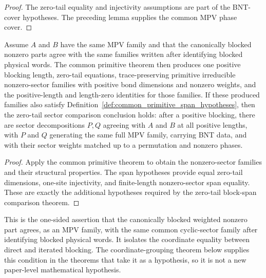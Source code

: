 \begin{proof}
	\leanok
	The zero-tail equality and injectivity assumptions are part of the BNT-cover
	hypotheses. The preceding lemma supplies the common MPV phase cover.
\end{proof}

\begin{lemma}%
\label{lem:afterBlocking_sectorComparison_zeroTail_of_reindexedNonzeroParts_spanHypotheses}
	\leanok
		Assume $A$ and $B$ have the same MPV family and that the canonically blocked
		nonzero parts agree with the same families written after identifying
		blocked physical words.  The common primitive theorem then produces one
	positive blocking length, zero-tail equations, trace-preserving primitive
	irreducible nonzero-sector families with positive bond dimensions and nonzero
	weights, and the positive-length and length-zero identities for those
	families.  If these produced families also satisfy
	Definition~\ref{def:common_primitive_span_hypotheses}, then the zero-tail
	sector comparison conclusion holds: after a positive blocking, there are
	sector decompositions $P,Q$ agreeing with $A$ and $B$ at all positive lengths,
	with $P$ and $Q$ generating the same full MPV family, carrying BNT data, and
	with their sector weights matched up to a permutation and nonzero phases.
\end{lemma}

\begin{proof}
	\leanok
	Apply the common primitive theorem to obtain the nonzero-sector families and
		their structural properties.  The span hypotheses provide equal
	zero-tail dimensions, one-site injectivity, and finite-length nonzero-sector
	span equality.  These are exactly the additional hypotheses required by the
	zero-tail block-span comparison theorem.
\end{proof}

\begin{definition}%
\label{def:common_sector_relabeling_hypothesis}
	\leanok
	This is the one-sided assertion that the canonically blocked weighted nonzero
	part agrees, as an MPV family, with the same common cyclic-sector family after
	identifying blocked physical words. It isolates the coordinate equality between
	direct and iterated blocking. The
	coordinate-grouping theorem below supplies this condition in the theorems that
	take it as a hypothesis, so it is not a new paper-level mathematical hypothesis.
\end{definition}

